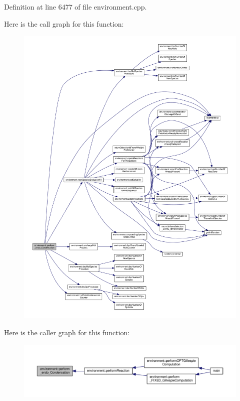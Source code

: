 Definition at line 6477 of file environment.\-cpp.



Here is the call graph for this function\-:\nopagebreak
\begin{figure}[H]
\begin{center}
\leavevmode
\includegraphics[width=350pt]{a00011_aa7a2cc95d8ba242c805a8fda063b23a7_cgraph}
\end{center}
\end{figure}




Here is the caller graph for this function\-:\nopagebreak
\begin{figure}[H]
\begin{center}
\leavevmode
\includegraphics[width=350pt]{a00011_aa7a2cc95d8ba242c805a8fda063b23a7_icgraph}
\end{center}
\end{figure}


